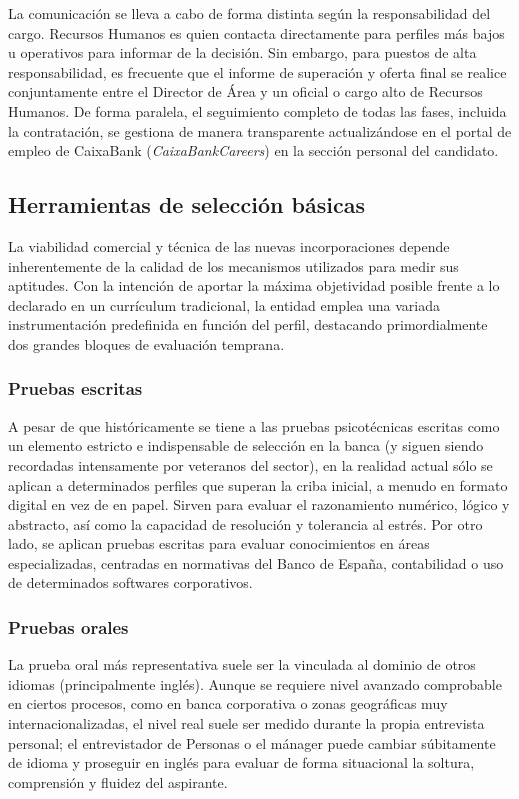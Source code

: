 La comunicación se lleva a cabo de forma distinta según la responsabilidad del cargo. Recursos Humanos es quien contacta directamente para perfiles más bajos u operativos para informar de la decisión. Sin embargo, para puestos de alta responsabilidad, es frecuente que el informe de superación y oferta final se realice conjuntamente entre el Director de Área y un oficial o cargo alto de Recursos Humanos. De forma paralela, el seguimiento completo de todas las fases, incluida la contratación, se gestiona de manera transparente actualizándose en el portal de empleo de CaixaBank (\textit{CaixaBankCareers}) en la sección personal del candidato.

\subsection{Herramientas de selección básicas}

La viabilidad comercial y técnica de las nuevas incorporaciones depende inherentemente de la calidad de los mecanismos utilizados para medir sus aptitudes. Con la intención de aportar la máxima objetividad posible frente a lo declarado en un currículum tradicional, la entidad emplea una variada instrumentación predefinida en función del perfil, destacando primordialmente dos grandes bloques de evaluación temprana.

\subsubsection{Pruebas escritas}
A pesar de que históricamente se tiene a las pruebas psicotécnicas escritas como un elemento estricto e indispensable de selección en la banca (y siguen siendo recordadas intensamente por veteranos del sector), en la realidad actual sólo se aplican a determinados perfiles que superan la criba inicial, a menudo en formato digital en vez de en papel. Sirven para evaluar el razonamiento numérico, lógico y abstracto, así como la capacidad de resolución y tolerancia al estrés.
Por otro lado, se aplican pruebas escritas para evaluar conocimientos en áreas especializadas, centradas en normativas del Banco de España, contabilidad o uso de determinados softwares corporativos.

\subsubsection{Pruebas orales}
La prueba oral más representativa suele ser la vinculada al dominio de otros idiomas (principalmente inglés). Aunque se requiere nivel avanzado comprobable en ciertos procesos, como en banca corporativa o zonas geográficas muy internacionalizadas, el nivel real suele ser medido durante la propia entrevista personal; el entrevistador de Personas o el mánager puede cambiar súbitamente de idioma y proseguir en inglés para evaluar de forma situacional la soltura, comprensión y fluidez del aspirante.

